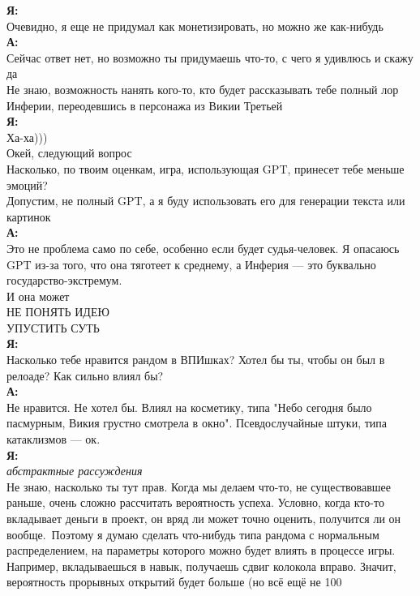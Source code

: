 \textbf{Я:}\\
Очевидно, я еще не придумал как монетизировать, но можно же как-нибудь\\

\textbf{А:}\\
Сейчас ответ нет, но возможно ты придумаешь что-то, с чего я удивлюсь и скажу да\\
Не знаю, возможность нанять кого-то, кто будет рассказывать тебе полный лор Инферии, переодевшись в персонажа из Викии Третьей\\

\textbf{Я:}\\
Ха-ха)))\\
Окей, следующий вопрос\\
Насколько, по твоим оценкам, игра, использующая GPT, принесет тебе меньше эмоций?\\
Допустим, не полный GPT, а я буду использовать его для генерации текста или картинок\\

\textbf{А:}\\
Это не проблема само по себе, особенно если будет судья-человек. Я опасаюсь GPT из-за того, что она тяготеет к среднему, а Инферия — это буквально государство-экстремум.\\
И она может\\
НЕ ПОНЯТЬ ИДЕЮ\\
УПУСТИТЬ СУТЬ\\

\textbf{Я:}\\
Насколько тебе нравится рандом в ВПИшках? Хотел бы ты, чтобы он был в релоаде? Как сильно влиял бы?\\

\textbf{А:}\\
Не нравится. Не хотел бы. Влиял на косметику, типа "Небо сегодня было пасмурным, Викия грустно смотрела в окно". Псевдослучайные штуки, типа катаклизмов — ок.\\

\textbf{Я:}\\
\textit{абстрактные рассуждения}\\
Не знаю, насколько ты тут прав. Когда мы делаем что-то, не существовавшее раньше, очень сложно рассчитать вероятность успеха. Условно, когда кто-то вкладывает деньги в проект, он вряд ли может точно оценить, получится ли он вообще.\
Поэтому я думаю сделать что-нибудь типа рандома с нормальным распределением, на параметры которого можно будет влиять в процессе игры. Например, вкладываешься в навык, получаешь сдвиг колокола вправо. Значит, вероятность прорывных открытий будет больше (но всё ещё не 100%

